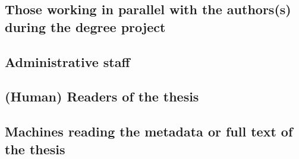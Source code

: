 \documentclass{article}
\begin{document}
\subsection{Those working in parallel with the authors(s) during the degree project}
\label{sec:examinerAdvisorsOpponent}

\subsection{Administrative staff}
\label{sec:adminStaff}

\subsection{(Human) Readers of the thesis}
\label{sec:readers}

\subsection{Machines reading the metadata or full text of the thesis}
\label{sec:searchEngines}


%
\end{document}
